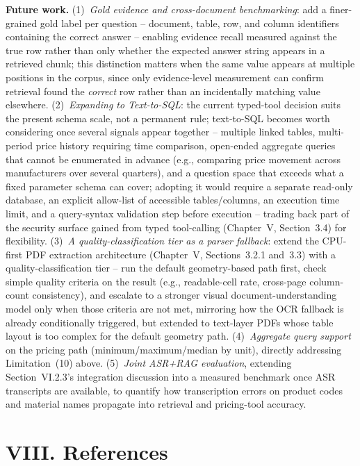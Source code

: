 \documentclass[11pt,a4paper]{article}
\newcommand{\chapterstart}[1]{\clearpage\section{#1}}
\begin{document}
\textbf{Future work.} (1)~\emph{Gold evidence and cross-document
benchmarking}: add a finer-grained gold label per question -- document,
table, row, and column identifiers containing the correct answer -- enabling
evidence recall measured against the true row rather than only whether the
expected answer string appears in a retrieved chunk; this distinction
matters when the same value appears at multiple positions in the corpus,
since only evidence-level measurement can confirm retrieval found the
\emph{correct} row rather than an incidentally matching value elsewhere.
(2)~\emph{Expanding to Text-to-SQL}: the current typed-tool decision suits
the present schema scale, not a permanent rule; text-to-SQL becomes worth
considering once several signals appear together -- multiple linked tables,
multi-period price history requiring time comparison, open-ended aggregate
queries that cannot be enumerated in advance (e.g., comparing price
movement across manufacturers over several quarters), and a question space
that exceeds what a fixed parameter schema can cover; adopting it would
require a separate read-only database, an explicit allow-list of accessible
tables/columns, an execution time limit, and a query-syntax validation step
before execution -- trading back part of the security surface gained from
typed tool-calling (Chapter~V, Section~3.4) for flexibility.
(3)~\emph{A quality-classification tier as a parser fallback}: extend the
CPU-first PDF extraction architecture (Chapter~V, Sections~3.2.1 and~3.3)
with a quality-classification tier -- run the default geometry-based path
first, check simple quality criteria on the result (e.g., readable-cell
rate, cross-page column-count consistency), and escalate to a stronger
visual document-understanding model only when those criteria are not met,
mirroring how the OCR fallback is already conditionally triggered, but
extended to text-layer PDFs whose table layout is too complex for the
default geometry path. (4)~\emph{Aggregate query support} on the pricing
path (minimum/maximum/median by unit), directly addressing Limitation~(10)
above. (5)~\emph{Joint ASR+RAG evaluation}, extending
Section~VI.2.3's integration discussion into a measured benchmark once ASR
transcripts are available, to quantify how transcription errors on product
codes and material names propagate into retrieval and pricing-tool
accuracy.

\chapterstart{VIII. References}
\end{document}
